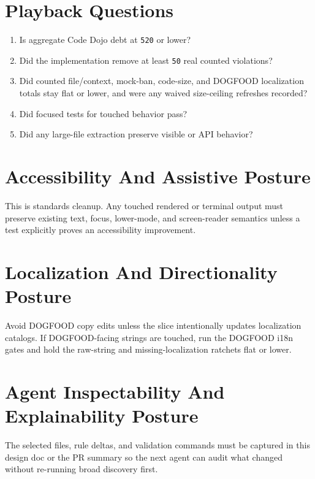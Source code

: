 \section{Playback Questions}\label{record-239-playback-questions}

\begin{enumerate}
\def\labelenumi{\arabic{enumi}.}
\tightlist
\item
  Is aggregate Code Dojo debt at \texttt{5\allowbreak{}2\allowbreak{}0} or lower?
\item
  Did the implementation remove at least \texttt{5\allowbreak{}0} real counted violations?
\item
  Did counted file/context, mock-ban, code-size, and DOGFOOD localization totals stay flat or lower, and were any waived size-ceiling refreshes recorded?
\item
  Did focused tests for touched behavior pass?
\item
  Did any large-file extraction preserve visible or API behavior?
\end{enumerate}

\section{Accessibility And Assistive Posture}\label{record-239-accessibility-and-assistive-posture}

This is standards cleanup. Any touched rendered or terminal output must preserve existing text, focus, lower-mode, and screen-reader semantics unless a test explicitly proves an accessibility improvement.

\section{Localization And Directionality Posture}\label{record-239-localization-and-directionality-posture}

Avoid DOGFOOD copy edits unless the slice intentionally updates localization catalogs. If DOGFOOD-facing strings are touched, run the DOGFOOD i18n gates and hold the raw-string and missing-localization ratchets flat or lower.

\section{Agent Inspectability And Explainability Posture}\label{record-239-agent-inspectability-and-explainability-posture}

The selected files, rule deltas, and validation commands must be captured in this design doc or the PR summary so the next agent can audit what changed without re-running broad discovery first.

